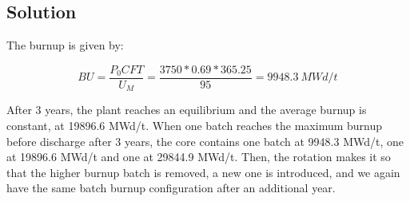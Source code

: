 \subsection{Solution}

The burnup is given by:

\begin{equation}
BU = \frac{P_0 CF T}{U_M} = \frac{3750 * 0.69 * 365.25}{95} = 9948.3\ MWd/t
\end{equation}

After 3 years, the plant reaches an equilibrium and the average burnup is constant, at 19896.6 MWd/t. When one batch reaches the maximum burnup before discharge after 3 years, the core contains one batch at 9948.3 MWd/t, one at 19896.6 MWd/t and one at 29844.9 MWd/t. Then, the rotation makes it so that the higher burnup batch is removed, a new one is introduced, and we again have the same batch burnup configuration after an additional year.
